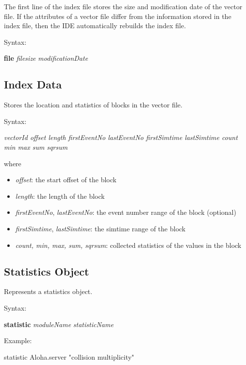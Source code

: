 The first line of the index file stores the size and modification date
of the vector file. If the attributes of a vector file differ from
the information stored in the index file, then the IDE automatically
rebuilds the index file.

Syntax:

\hspace{20mm} \textbf{file} \textit{filesize} \textit{modificationDate}

\subsection{Index Data}
\label{sec:result-file-formats:opp:index-data}

Stores the location and statistics of blocks in the vector file.

Syntax:

\hspace{20mm} {\textit{vectorId offset length firstEventNo lastEventNo
                       firstSimtime lastSimtime count min max sum sqrsum}}

where

\begin{itemize}
    \item\textit{offset}: the start offset of the block
    \item\textit{length}: the length of the block
    \item\textit{firstEventNo}, \textit{lastEventNo}:
        the event number range of the block (optional)
    \item\textit{firstSimtime}, \textit{lastSimtime}:
        the simtime range of the block
    \item\textit{count, min, max, sum, sqrsum}:
        collected statistics of the values in the block

\end{itemize}

\subsection{Statistics Object}
\label{sec:result-file-formats:opp:statistics-object}

Represents a statistics object.

Syntax:

\hspace{20mm} \textbf{statistic} \textit{moduleName} \textit{statisticName}

Example:

\begin{filelisting}
statistic Aloha.server 	"collision multiplicity"
\end{filelisting}

